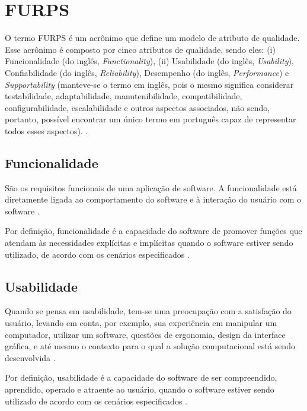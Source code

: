 \section{FURPS}
\label{sec:furps}

O termo FURPS é um acrônimo que define um modelo de atributo de qualidade. Esse acrônimo é composto por cinco atributos de qualidade, sendo eles: (i) Funcionalidade (do inglês, \textit{Functionality}), (ii) Usabilidade (do inglês, \textit{Usability}), Confiabilidade (do inglês, \textit{Reliability}), Desempenho (do inglês, \textit{Performance}) e \textit{Supportability} (manteve-se o termo em inglês, pois o mesmo significa considerar testabilidade, adaptabilidade, manutenibilidade, compatibilidade, configurabilidade, escalabilidade e outros aspectos associados, não sendo, portanto, possível encontrar um único termo em português capaz de representar todos esses aspectos). \cite{umar2011analyzing}.

\subsection{Funcionalidade}
\label{subsec:funcionalidade}

São os requisitos funcionais de uma aplicação de software. A funcionalidade está diretamente ligada ao comportamento do software e à interação do usuário com o software \cite{cintra2006implementaccao}.

Por definição, funcionalidade é a capacidade do software de promover funções que atendam às necessidades explícitas e implícitas quando o software estiver sendo utilizado, de acordo com os cenários especificados \cite{qualidadeDeProdutoNBR}.

\subsection{Usabilidade}
\label{subsec:usabilidade}

Quando se pensa em usabilidade, tem-se uma preocupação com a satisfação do usuário, levando em conta, por exemplo, sua experiência em manipular um computador, utilizar um software, questões de ergonomia, design da interface gráfica, e até mesmo o contexto para o qual a solução computacional está sendo desenvolvida \cite{cintra2006implementaccao}.

Por definição, usabilidade é a capacidade do software de ser compreendido, aprendido, operado e atraente ao usuário, quando o software estiver sendo utilizado de acordo com os cenários especificados \cite{qualidadeDeProdutoNBR}.


